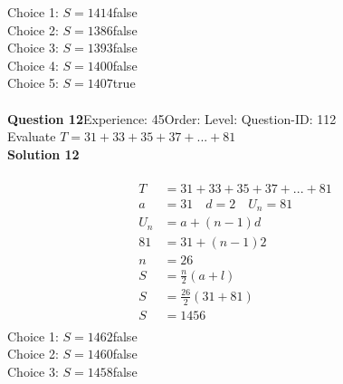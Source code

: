 \documentclass{article}
\begin{document}
Choice 1: \hspace{20pt}$S=1414$\hspace{20pt}false\\
Choice 2: \hspace{20pt}$S=1386$\hspace{20pt}false\\
Choice 3: \hspace{20pt}$S=1393$\hspace{20pt}false\\
Choice 4: \hspace{20pt}$S=1400$\hspace{20pt}false\\
Choice 5: \hspace{20pt}$S=1407$\hspace{20pt}true\\
\\[4pt]
\noindent\textbf{Question 12}\hspace{20pt}Experience: 45\hspace{20pt}Order: \hspace{20pt}Level: \hspace{20pt}Question-ID: 112\\[2pt]
Evaluate $T=31+33+35+37+...+81$\\[4pt]
\noindent\textbf{Solution 12}\\[2pt]
\\[-35pt]\begin{align*}
T&=31+33+35+37+...+81\\[2pt]
a&=31\quad d=2 \quad U_n=81\\[2pt]
U_n&=a+(n-1)d\\[2pt]
81&=31+(n-1)2\\[2pt]
n&=26\\[12pt]
S&=\displaystyle\frac{n}{2}(a+l)\\[2pt]
S&=\displaystyle\frac{26}{2}(31+81)\\[2pt]
S&=1456\\[-140pt]
\end{align*}
Choice 1: \hspace{20pt}$S=1462$\hspace{20pt}false\\
Choice 2: \hspace{20pt}$S=1460$\hspace{20pt}false\\
Choice 3: \hspace{20pt}$S=1458$\hspace{20pt}false\\
\end{document}
